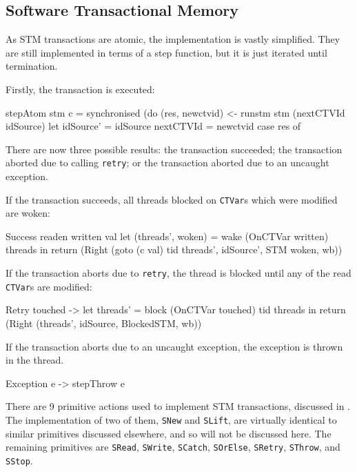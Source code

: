 \subsection{Software Transactional Memory}
\label{sec:execution-stepwise-stm}

As STM transactions are atomic, the implementation is vastly
simplified. They are still implemented in terms of a step function,
but it is just iterated until termination.

Firstly, the transaction is executed:

\begin{haskellcode}
stepAtom stm c = synchronised (do
  (res, newctvid) <- runstm stm (nextCTVId idSource)
  let idSource'   = idSource { nextCTVId = newctvid }
  case res of
\end{haskellcode}

There are now three possible results: the transaction succeeded; the
transaction aborted due to calling \verb|retry|; or the transaction
aborted due to an uncaught exception.

If the transaction succeeds, all threads blocked on \verb|CTVar|s
which were modified are woken:

\begin{haskellcode}
    Success readen written val
      let (threads', woken) = wake (OnCTVar written) threads
      in return (Right (goto (c val) tid threads', idSource', STM woken, wb))
\end{haskellcode}

If the transaction aborts due to \verb|retry|, the thread is blocked
until any of the read \verb|CTVar|s are modified:

\begin{haskellcode}
    Retry touched ->
      let threads' = block (OnCTVar touched) tid threads
      in return (Right (threads', idSource, BlockedSTM, wb))
\end{haskellcode}

If the transaction aborts due to an uncaught exception, the exception
is thrown in the thread.

\begin{haskellcode}
    Exception e -> stepThrow e
\end{haskellcode}

There are 9 primitive actions used to implement STM transactions,
discussed in . The implementation of two of
them, \verb|SNew| and \verb|SLift|, are virtually identical to similar
primitives discussed elsewhere, and so will not be discussed here. The
remaining primitives are \verb|SRead|, \verb|SWrite|, \verb|SCatch|,
\verb|SOrElse|, \verb|SRetry|, \verb|SThrow|, and \verb|SStop|.

